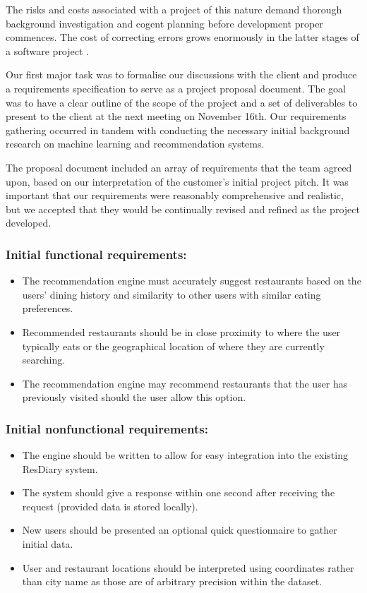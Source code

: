 \documentclass{l3proj}
\begin{document}
The risks and costs associated with a project of this nature demand thorough background investigation and cogent planning before development proper commences. The cost of correcting errors grows enormously in the latter stages of a software project \cite{SoftwareErrorAnalysis}.

Our first major task was to formalise our discussions with the client and produce a requirements specification to serve as a project proposal document. The goal was to have a clear outline of the scope of the project and a set of deliverables to present to the client at the next meeting on November 16th. Our requirements gathering occurred in tandem with conducting the necessary initial background research on machine learning and recommendation systems. 

The proposal document included an array of requirements that the team agreed upon, based on our interpretation of the customer's initial project pitch. It was important that our requirements were reasonably comprehensive and realistic, but we accepted that they would be continually revised and refined as the project developed. 

\subsubsection{Initial functional requirements:}
\begin{itemize}
\item The recommendation engine must accurately suggest restaurants based on the users' dining history and similarity to other users with similar eating preferences.
\item Recommended restaurants should be in close proximity to where the user typically eats or the geographical location of where they are currently searching.
\item The recommendation engine may recommend restaurants that the user has previously visited should the user allow this option.
\end{itemize}

\subsubsection{Initial nonfunctional requirements:}
\begin{itemize}
\item The engine should be written to allow for easy integration into the existing ResDiary system.
\item The system should give a response within one second after receiving the request (provided data is stored locally).
\item New users should be presented an optional quick questionnaire to gather initial data.
\item User and restaurant locations should be interpreted using coordinates rather than city name as those are of arbitrary precision within the dataset.
\end{itemize}
\end{document}
